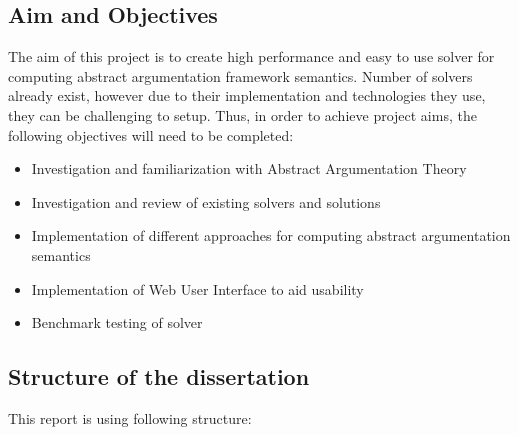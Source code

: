 \subsection{Aim and Objectives}
The aim of this project is to create high performance and easy to use solver for computing abstract argumentation framework semantics. Number of solvers already exist, however due to their implementation and technologies they use, they can be challenging to setup. Thus, in order to achieve project aims, the following objectives will need to be completed:
\begin{itemize}
	\item Investigation and familiarization with Abstract Argumentation Theory
	\item Investigation and review of existing solvers and solutions
	\item Implementation of different approaches for computing abstract argumentation semantics
	\item Implementation of Web User Interface to aid usability
	\item Benchmark testing of solver
\end{itemize}

\subsection{Structure of the dissertation}
This report is using following structure:

